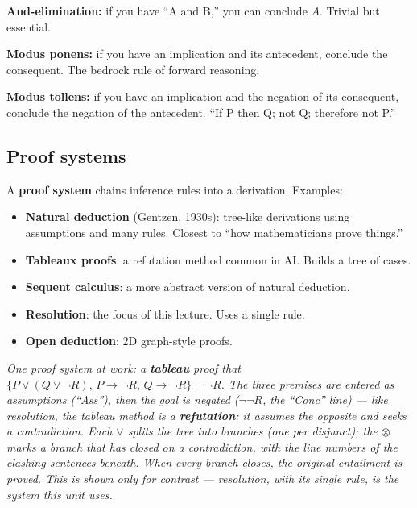 \documentclass[11pt, a4paper]{article}
\begin{document}
\textbf{And-elimination:} if you have ``A and B,'' you can conclude $A$. Trivial but essential.

\textbf{Modus ponens:} if you have an implication and its antecedent, conclude the consequent. The bedrock rule of forward reasoning.

\textbf{Modus tollens:} if you have an implication and the negation of its consequent, conclude the negation of the antecedent. ``If P then Q; not Q; therefore not P.''

\subsection{Proof systems}

A \textbf{proof system} chains inference rules into a derivation. Examples:

\begin{itemize}
  \item \textbf{Natural deduction} (Gentzen, 1930s): tree-like derivations using assumptions and many rules. Closest to ``how mathematicians prove things.''
  \item \textbf{Tableaux proofs}: a refutation method common in AI. Builds a tree of cases.
  \item \textbf{Sequent calculus}: a more abstract version of natural deduction.
  \item \textbf{Resolution}: the focus of this lecture. Uses a single rule.
  \item \textbf{Open deduction}: 2D graph-style proofs.
\end{itemize}

\begin{center}

\footnotesize\textit{One proof system at work: a \textbf{tableau} proof that $\{P \lor (Q \lor \neg R),\, P \rightarrow \neg R,\, Q \rightarrow \neg R\} \vdash \neg R$. The three premises are entered as assumptions (``Ass''), then the goal is \emph{negated} ($\neg\neg R$, the ``Conc'' line) — like resolution, the tableau method is a \textbf{refutation}: it assumes the opposite and seeks a contradiction. Each $\lor$ splits the tree into branches (one per disjunct); the $\otimes$ marks a branch that has closed on a contradiction, with the line numbers of the clashing sentences beneath. When \emph{every} branch closes, the original entailment is proved. This is shown only for contrast — resolution, with its single rule, is the system this unit uses.}
\end{center}
\end{document}
